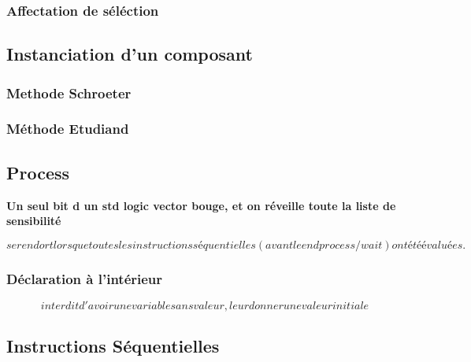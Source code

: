 
\subsubsection{Affectation de séléction}


\subsection{Instanciation d'un composant}
\subsubsection{Methode Schroeter}

\subsubsection{Méthode Etudiand}



\subsection{Process}

\textbf{Un seul bit d un std logic vector bouge, et on réveille toute la liste de sensibilité}

$$se rendort lorsque toutes les instructions
séquentielles (avant le end process / wait)
ont été évaluées.$$

\subsubsection{Déclaration à l'intérieur}

$$interdit d'avoir une variable sans valeur, leur donner une valeur initiale$$



\subsection{Instructions Séquentielles}



